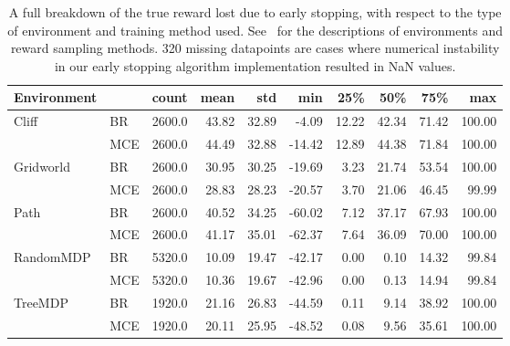 \begin{table}[htbp]
\centering
\label{tab:results}
\begin{tabular}{llrrrrrrrr}
\toprule
Environment & &   count &   mean &    std &    min &    25\% &    50\% &    75\% &     max \\
\midrule
Cliff & BR &  2600.0 &  43.82 &  32.89 &  -4.09 &  12.22 &  42.34 &  71.42 &  100.00 \\
        & MCE &  2600.0 &  44.49 &  32.88 & -14.42 &  12.89 &  44.38 &  71.84 &  100.00 \\
Gridworld & BR &  2600.0 &  30.95 &  30.25 & -19.69 &   3.23 &  21.74 &  53.54 &  100.00 \\
        & MCE &  2600.0 &  28.83 &  28.23 & -20.57 &   3.70 &  21.06 &  46.45 &   99.99 \\
Path & BR &  2600.0 &  40.52 &  34.25 & -60.02 &   7.12 &  37.17 &  67.93 &  100.00 \\
        & MCE &  2600.0 &  41.17 &  35.01 & -62.37 &   7.64 &  36.09 &  70.00 &  100.00 \\
RandomMDP & BR &  5320.0 &  10.09 &  19.47 & -42.17 &   0.00 &   0.10 &  14.32 &   99.84 \\
        & MCE &  5320.0 &  10.36 &  19.67 & -42.96 &   0.00 &   0.13 &  14.94 &   99.84 \\
TreeMDP & BR &  1920.0 &  21.16 &  26.83 & -44.59 &   0.11 &   9.14 &  38.92 &  100.00 \\
        & MCE &  1920.0 &  20.11 &  25.95 & -48.52 &   0.08 &   9.56 &  35.61 &  100.00 \\
\bottomrule
\end{tabular}

\caption{A full breakdown of the true reward lost due to early stopping, with respect to the type of environment and training method used. See~ for the descriptions of environments and reward sampling methods. 320 missing datapoints are cases where numerical instability in our early stopping algorithm implementation resulted in NaN values.}
\end{table}


